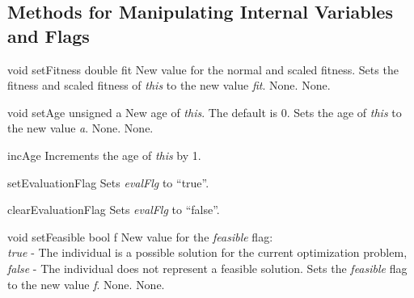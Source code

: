\subsection{Methods for Manipulating Internal Variables and Flags}

\setNormalInstance
\printMethodWithOneParam
{void}
{setFitness}
{double}
{fit}
{New value for the normal and scaled fitness.}
{Sets the fitness and scaled fitness of {\em this} to the new
 value {\em fit}.}
{None.}
{None.}

\vspace*{4ex}

\setNormalInstance
\printMethodWithOneParam
{void}
{setAge}
{unsigned}
{a}
{New age of {\em this}. The default is 0.}
{Sets the age of {\em this} to the new value {\em a}.}
{None.}
{None.}

\vspace*{4ex}

\setNormalInstance
\printEmptyMethod
{incAge}
{Increments the age of {\em this} by 1.}

\clearpage

\setNormalInstance
\printEmptyMethod
{setEvaluationFlag}
{Sets {\em evalFlg} to ``true''.}

\vspace*{4ex}

\setNormalInstance
\printEmptyMethod
{clearEvaluationFlag}
{Sets {\em evalFlg} to ``false''.}

\vspace*{4ex}

\setNormalInstance
\printMethodWithOneParam
{void}
{setFeasible}
{bool}
{f}
{New value for the {\em feasible} flag:\\
{\em true} - The individual is a possible solution for the current
 optimization problem,\\
{\em false} - The individual does not represent a feasible solution.}
{Sets the {\em feasible} flag to the new value {\em f}.}
{None.}
{None.}

